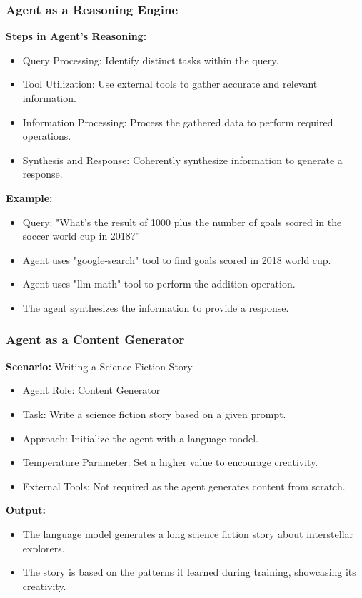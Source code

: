 \begin{frame}[fragile]
\frametitle{Agent as a Reasoning Engine}

\textbf{Steps in Agent's Reasoning:}
\begin{itemize}
    \item Query Processing: Identify distinct tasks within the query.
    \item Tool Utilization: Use external tools to gather accurate and relevant information.
    \item Information Processing: Process the gathered data to perform required operations.
    \item Synthesis and Response: Coherently synthesize information to generate a response.
\end{itemize}

\textbf{Example:}
\begin{itemize}
    \item Query: "What's the result of 1000 plus the number of goals scored in the soccer world cup in 2018?”
    \item Agent uses "google-search" tool to find goals scored in 2018 world cup.
    \item Agent uses "llm-math" tool to perform the addition operation.
    \item The agent synthesizes the information to provide a response.
\end{itemize}

\end{frame}

\begin{frame}[fragile]
\frametitle{Agent as a Content Generator}

\textbf{Scenario:} Writing a Science Fiction Story

\begin{itemize}
    \item Agent Role: Content Generator
    \item Task: Write a science fiction story based on a given prompt.
    \item Approach: Initialize the agent with a language model.
    \item Temperature Parameter: Set a higher value to encourage creativity.
    \item External Tools: Not required as the agent generates content from scratch.
\end{itemize}

\textbf{Output:}
\begin{itemize}
    \item The language model generates a long science fiction story about interstellar explorers.
    \item The story is based on the patterns it learned during training, showcasing its creativity.
\end{itemize}

\end{frame}

